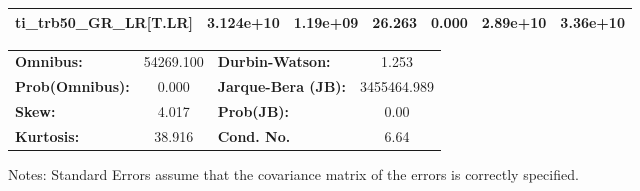 \begin{center}
\begin{tabular}{lcccccc}
\textbf{ti\_trb50\_GR\_LR[T.LR]}        &    3.124e+10  &     1.19e+09     &    26.263  &         0.000        &     2.89e+10    &     3.36e+10     \\
\bottomrule
\end{tabular}
\begin{tabular}{lclc}
\textbf{Omnibus:}       & 54269.100 & \textbf{  Durbin-Watson:     } &      1.253   \\
\textbf{Prob(Omnibus):} &    0.000  & \textbf{  Jarque-Bera (JB):  } & 3455464.989  \\
\textbf{Skew:}          &    4.017  & \textbf{  Prob(JB):          } &       0.00   \\
\textbf{Kurtosis:}      &   38.916  & \textbf{  Cond. No.          } &       6.64   \\
\bottomrule
\end{tabular}
\end{center}

Notes: \newline
 [1] Standard Errors assume that the covariance matrix of the errors is correctly specified.

